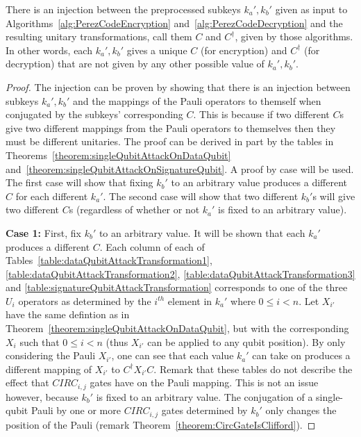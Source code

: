 \begin{theorem}
There is an injection between the preprocessed subkeys $k_a',k_b'$ given as input to Algorithms~\ref{alg:PerezCodeEncryption} and~\ref{alg:PerezCodeDecryption} and the resulting unitary transformations, call them $C$ and $C^{\dagger}$, given by those algorithms. In other words, each $k_a',k_b'$ gives a unique $C$ (for encryption) and $C^{\dagger}$ (for decryption) that are not given by any other possible value of  $k_a',k_b'$.
\end{theorem}
\begin{proof}
The injection can be proven by showing that there is an injection between subkeys $k_a',k_b'$ and the mappings of the Pauli operators to themself when conjugated by the subkeys' corresponding $C$. This is because if two different $C$s give two different mappings from the Pauli operators to themselves then they must be different unitaries. The proof can be derived in part by the tables in Theorems~\ref{theorem:singleQubitAttackOnDataQubit} and~\ref{theorem:singleQubitAttackOnSignatureQubit}. A proof by case will be used. The first case will show that fixing $k_b'$ to an arbitrary value produces a different $C$ for each different $k_a'$. The second case will show that two different $k_b'$s will give two different $C$s (regardless of whether or not $k_a'$ is fixed to an arbitrary value).

\textbf{Case 1:} First, fix $k_b'$ to an arbitrary value. It will be shown that each $k_a'$ produces a different $C$. Each column of each of Tables~\ref{table:dataQubitAttackTransformation1},\ref{table:dataQubitAttackTransformation2}, \ref{table:dataQubitAttackTransformation3} and \ref{table:signatureQubitAttackTransformation} corresponds to one of the three $U_i$ operators as determined by the $i^{th}$ element in $k_a'$ where $0 \leq i < n$. Let $X_{i'}$ have the same defintion as in Theorem~\ref{theorem:singleQubitAttackOnDataQubit}, but with the corresponding $X_i$ such that $0 \leq i < n$ (thus $X_{i'}$ can be applied to any qubit position). By only considering the Pauli $X_{i'}$, one can see that each value $k_a'$ can take on produces a different mapping of $X_{i'}$ to $C^{\dagger} X_{i'} C$. Remark that these tables do not describe the effect that $\mathit{CIRC}_{i,j}$ gates have on the Pauli mapping. This is not an issue however, because $k_b'$ is fixed to an arbitrary value. The conjugation of a single-qubit Pauli by one or more $\mathit{CIRC}_{i,j}$ gates determined by $k_b'$ only changes the position of the Pauli (remark Theorem~\ref{theorem:CircGateIsClifford}).


\end{proof}
